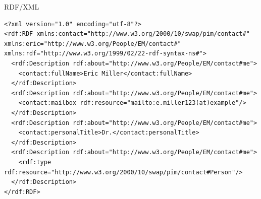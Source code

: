 \documentclass[ignorenonframetext,xcolor=x11names]{beamer}
\begin{document}
\begin{frame}[fragile]{RDF/XML}
\tiny
\begin{verbatim}
<?xml version="1.0" encoding="utf-8"?>
<rdf:RDF xmlns:contact="http://www.w3.org/2000/10/swap/pim/contact#" 
xmlns:eric="http://www.w3.org/People/EM/contact#" 
xmlns:rdf="http://www.w3.org/1999/02/22-rdf-syntax-ns#">
  <rdf:Description rdf:about="http://www.w3.org/People/EM/contact#me">
    <contact:fullName>Eric Miller</contact:fullName>
  </rdf:Description>
  <rdf:Description rdf:about="http://www.w3.org/People/EM/contact#me">
    <contact:mailbox rdf:resource="mailto:e.miller123(at)example"/>
  </rdf:Description>
  <rdf:Description rdf:about="http://www.w3.org/People/EM/contact#me">
    <contact:personalTitle>Dr.</contact:personalTitle>
  </rdf:Description>
  <rdf:Description rdf:about="http://www.w3.org/People/EM/contact#me">
    <rdf:type rdf:resource="http://www.w3.org/2000/10/swap/pim/contact#Person"/>
  </rdf:Description>
</rdf:RDF>
\end{verbatim}
\end{frame}
\end{document}
